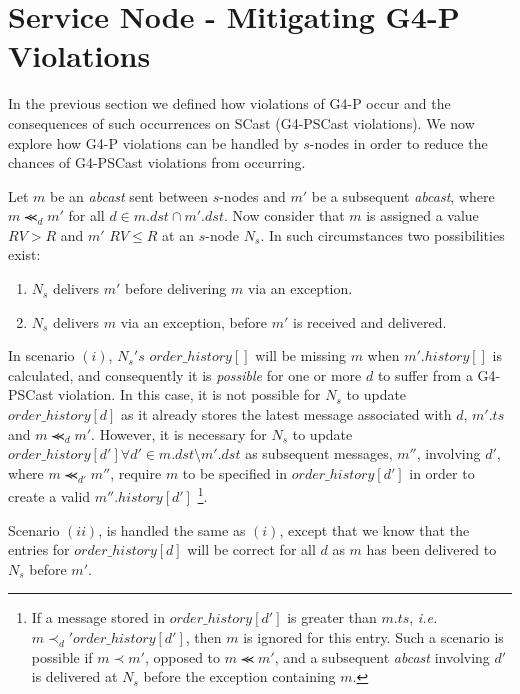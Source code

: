 \section{Service Node - Mitigating G4-P Violations}
In the previous section we defined how violations of G4-P occur and the consequences of such occurrences on \textsf{SCast} (G4-PSCast violations).  We now explore how G4-P violations can be handled by $s$-nodes in order to reduce the chances of G4-PSCast violations from occurring.  

Let $m$ be an \emph{abcast} sent between $s$-nodes and $m'$ be a subsequent \emph{abcast}, where $m \llcurly_d m'$ for all $d \in m.dst \cap m'.dst$.  Now consider that $m$ is assigned a value $RV > R$ and $m'$ $RV \leq R$ at an $s$-node $N_s$.  In such circumstances two possibilities exist:

    \begin{enumerate}
        \item    $N_s$ delivers $m'$ before delivering $m$ via an exception.
        
        \item    $N_s$ delivers $m$ via an exception, before $m'$ is received and delivered.  
    \end{enumerate}
    
    In scenario $(i)$, $N_s's$ $order\_history[]$ will be missing $m$ when $m'.history[]$ is calculated, and consequently it is \emph{possible} for one or more $d$ to suffer from a G4-PSCast violation.  In this case, it is not possible for $N_s$ to update $order\_history[d]$ as it already stores the latest message associated with $d$, $m'.ts$ and $m \llcurly_d m'$.  However, it is necessary for $N_s$ to update $order\_history[d'] \forall d' \in m.dst \setminus m'.dst$ as subsequent messages, $m''$, involving $d'$, where $m \llcurly_{d'} m''$, require $m$ to be specified in $order\_history[d']$ in order to create a valid $m''.history[d']$ \footnote{If a message stored in $order\_history[d']$ is greater than $m.ts$, \emph{i.e.} $m \prec_d' order\_history[d']$, then $m$ is ignored for this entry.  Such a scenario is possible if $m \prec m'$, opposed to $m \llcurly m'$, and a subsequent \emph{abcast} involving $d'$ is delivered at $N_s$ before the exception containing $m$.}.   
    
    Scenario $(ii)$, is handled the same as $(i)$, except that we know that the entries for $order\_history[d]$ will be correct for all $d$ as $m$ has been delivered to $N_s$ before $m'$.  

